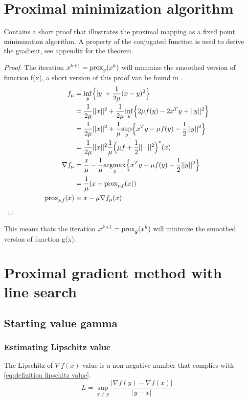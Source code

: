 	\section{Proximal minimization algorithm}
		 \cite{QianYang} Contains a short proof that illustrates the proximal mapping as a fixed point minimization algorithm. A property of the conjugated function is used to derive the gradient, see appendix for the theorem.
		 \begin{proof}
		 	The iteration $x^{k+1}=\operatorname{prox}_g(x^k)$ will minimize the smoothed version of function f(x), a short version of this proof van be found in \cite{QianYang}. 
		 	\begin{align*}
		 	f_{\mu}
		 	&= \underset{y}{\inf}\Big\{ |y| +\frac{1}{2 \mu}(x-y)^2 \Big\} \\
		 	&=   \frac{1}{2 \mu}||x||^2 + \frac{1}{2\mu} 
		 	\underset{y}{\inf}\Big\{
		 	2 \mu f(y) - 2x^T y + ||y||^2
		 	\Big\} \\
		 	&=  \frac{1}{2 \mu}||x||^2 + \frac{1}{\mu} 
		 	\underset{y}{\sup}\Big\{
		 	x^T y  - \mu f(y) - \frac{1}{2} ||y||^2 \Big \} \\
		 	&= \frac{1}{2\mu }||x||^2 \frac{1}{\mu } \Big( \mu f + \frac{1}{2}||\cdot||^2 \Big)^* (x) \\
		 	\nabla  f_{\mu} 
		 	&= \frac{x}{\mu} - \frac{1}{\mu} \underset{y}{\operatorname{argmax}} 
		 	\Big \{ x^Ty - \mu f(y) - \frac{1}{2}||y||^2 \Big \}\\
		 	& = \frac{1}{\mu}(x - \operatorname{prox}_{\mu f}(x)) \\
		 	\operatorname{prox}_{\mu f}(x)
		 	& = x- \mu \nabla f_{\mu}(x)
		 	\end{align*}
		 	\label{prf:proximal minimiztion alg proof}
		 \end{proof}

		 This means thats the iteration $x^{k+1}=\operatorname{prox}_g(x^k)$ will minimize the smoothed version of function g(x). 

\section{Proximal gradient method with line search}
	\subsection{Starting value gamma }
		\subsubsection{Estimating Lipschitz value}
			The Lipschitz of $\nabla f(x)$ value is a non negative number that complies with \eqref{eq:definition lipschitz value}.
			\begin{equation}
			L = \underset{x \neq y}{\sup} \frac{|\nabla f(y)-\nabla f(x)|}{|y-x|}
			\label{eq:definition lipschitz value}
			\end{equation}
			
